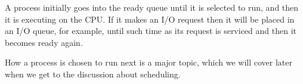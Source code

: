 A process initially goes into the ready queue until it is selected to run, and then it is executing on the CPU. If it makes an I/O request then it will be placed in an I/O queue, for example, until such time as its request is serviced and then it becomes ready again.

How a process is chosen to run next is a major topic, which we will cover later when we get to the discussion about scheduling.



